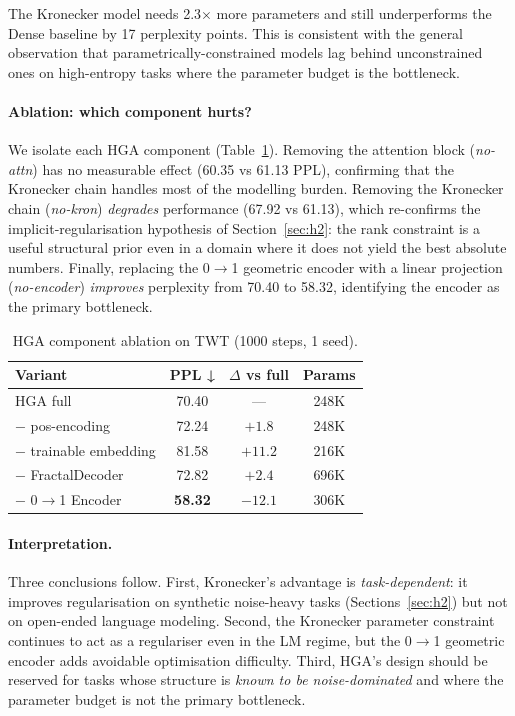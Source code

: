 \documentclass[11pt,a4paper]{article}
\begin{document}
The Kronecker model needs 2.3$\times$ more parameters and still
underperforms the Dense baseline by 17 perplexity points.
This is consistent with the general observation \cite{krogh1991simple}
that parametrically-constrained models lag behind unconstrained ones on
high-entropy tasks where the parameter budget is the bottleneck.

\paragraph{Ablation: which component hurts?}
We isolate each HGA component (Table~\ref{tab:lm-ablation}).
Removing the attention block (\emph{no-attn}) has no measurable
effect (60.35 vs 61.13 PPL), confirming that the Kronecker chain
handles most of the modelling burden. Removing the Kronecker chain
(\emph{no-kron}) \emph{degrades} performance (67.92 vs 61.13),
which re-confirms the implicit-regularisation hypothesis of
Section~\ref{sec:h2}: the rank constraint is a useful structural
prior even in a domain where it does not yield the best absolute
numbers. Finally, replacing the 0$\to$1 geometric encoder with a
linear projection (\emph{no-encoder}) \emph{improves} perplexity
from 70.40 to 58.32, identifying the encoder as the primary
bottleneck.

\begin{table}[h]
\centering
\caption{HGA component ablation on TWT (1000 steps, 1 seed).}
\label{tab:lm-ablation}
\small
\begin{tabular}{lccc}
\toprule
Variant & PPL ↓ & $\Delta$ vs full & Params \\
\midrule
HGA full & 70.40 & — & 248K \\
$-$ pos-encoding & 72.24 & $+1.8$ & 248K \\
$-$ trainable embedding & 81.58 & $+11.2$ & 216K \\
$-$ FractalDecoder & 72.82 & $+2.4$ & 696K \\
$-$ 0$\to$1 Encoder & \textbf{58.32} & $-12.1$ & 306K \\
\bottomrule
\end{tabular}
\end{table}

\paragraph{Interpretation.}
Three conclusions follow. First, Kronecker's advantage is
\emph{task-dependent}: it improves regularisation on synthetic
noise-heavy tasks (Sections~\ref{sec:h2}) but not on open-ended
language modeling. Second, the Kronecker parameter constraint
continues to act as a regulariser even in the LM regime, but
the 0$\to$1 geometric encoder adds avoidable optimisation
difficulty. Third, HGA's design should be reserved for tasks
whose structure is \emph{known to be noise-dominated} and where
the parameter budget is not the primary bottleneck.
\end{document}
